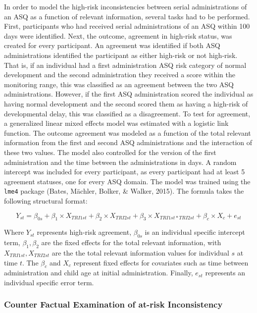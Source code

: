\documentclass[
  11pt,
]{article}
\begin{document}
In order to model the high-risk inconsistencies between serial
administrations of an ASQ as a function of relevant information, several
tasks had to be performed. First, participants who had received serial
administrations of an ASQ within 100 days were identified. Next, the
outcome, agreement in high-risk status, was created for every
participant. An agreement was identified if both ASQ administrations
identified the participant as either high-risk or not high-risk. That
is, if an individual had a first administration ASQ risk category of
normal development and the second administration they received a score
within the monitoring range, this was classified as an agreement between
the two ASQ administrations. However, if the first ASQ administration
scored the individual as having normal development and the second scored
them as having a high-risk of developmental delay, this was classified
as a disagreement. To test for agreement, a generalized linear mixed
effects model was estimated with a logistic link function. The outcome
agreement was modeled as a function of the total relevant information
from the first and second ASQ administrations and the interaction of
these two values. The model also controlled for the version of the first
administration and the time between the administrations in days. A
random intercept was included for every participant, as every
participant had at least 5 agreement statuses, one for every ASQ domain.
The model was trained using the \texttt{lme4} package (Bates, Mächler,
Bolker, \& Walker, 2015). The formula takes the following structural
format:

\[
Y_{st}=\beta_{0s}+\beta_{1} \times X_{TRI1st} + \beta_2 \times X_{TRI2st} + \beta_3 \times X_{TRI1st*TRI2st}+ \beta_{c} \times X_{c} + e_{st}
\]

Where \(Y_{st}\) represents high-risk agreement, \(\beta_{0s}\) is an
individual specific intercept term, \(\beta_{1}, \beta_{2}\) are the
fixed effects for the total relevant information, with
\(X_{TRI1st},X_{TRI2st}\) are the the total relevant information values
for individual \(s\) at time \(t\). The \(\beta_c\) and \(X_c\)
represent fixed effects for covariates such as time between
administration and child age at initial administration. Finally,
\(e_{st}\) represents an individual specific error term.

\hypertarget{counter-factual-examination-of-at-risk-inconsistency}{%
\subsubsection{Counter Factual Examination of at-risk
Inconsistency}\label{counter-factual-examination-of-at-risk-inconsistency}}
\end{document}
